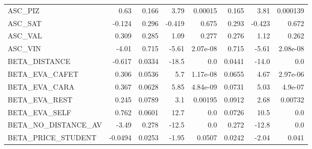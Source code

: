 \begin{tabular}{lrrrrrrr}
ASC\_PIZ             &    0.63 &    0.166 &    3.79 &  0.00015 &         0.165 &         3.81 &      0.000139 \\
ASC\_SAT             &  -0.124 &    0.296 &  -0.419 &    0.675 &         0.293 &       -0.423 &         0.672 \\
ASC\_VAL             &   0.309 &    0.285 &    1.09 &    0.277 &         0.276 &         1.12 &         0.262 \\
ASC\_VIN             &   -4.01 &    0.715 &   -5.61 & 2.07e-08 &         0.715 &        -5.61 &      2.08e-08 \\
BETA\_DISTANCE       &  -0.617 &   0.0334 &   -18.5 &      0.0 &        0.0441 &        -14.0 &           0.0 \\
BETA\_EVA\_CAFET      &   0.306 &   0.0536 &     5.7 & 1.17e-08 &        0.0655 &         4.67 &      2.97e-06 \\
BETA\_EVA\_CARA       &   0.367 &   0.0628 &    5.85 & 4.84e-09 &        0.0731 &         5.03 &       4.9e-07 \\
BETA\_EVA\_REST       &   0.245 &   0.0789 &     3.1 &  0.00195 &        0.0912 &         2.68 &       0.00732 \\
BETA\_EVA\_SELF       &   0.762 &   0.0601 &    12.7 &      0.0 &        0.0726 &         10.5 &           0.0 \\
BETA\_NO\_DISTANCE\_AV &   -3.49 &    0.278 &   -12.5 &      0.0 &         0.272 &        -12.8 &           0.0 \\
BETA\_PRICE\_STUDENT  & -0.0494 &   0.0253 &   -1.95 &   0.0507 &        0.0242 &        -2.04 &         0.041 \\
\bottomrule
\end{tabular}

